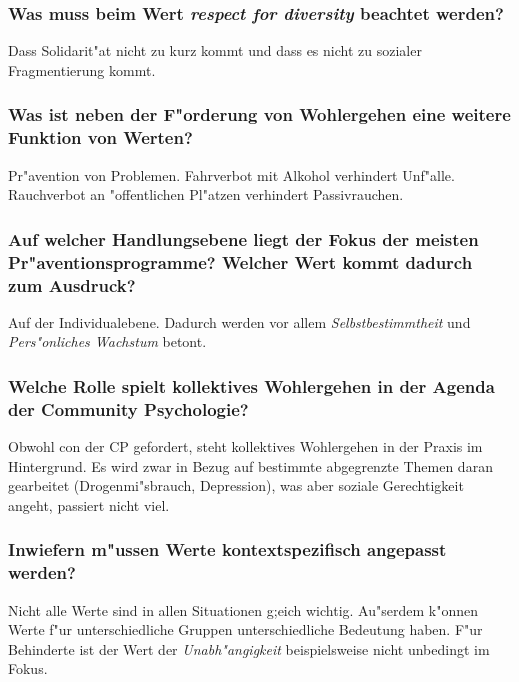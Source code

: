 \subsubsection{Was muss beim Wert \emph{respect for diversity} beachtet werden?}
Dass Solidarit"at nicht zu kurz kommt und dass es nicht zu sozialer Fragmentierung kommt.

\subsubsection{Was ist neben der F"orderung von Wohlergehen eine weitere Funktion von Werten?}
Pr"avention von Problemen. Fahrverbot mit Alkohol verhindert Unf"alle. Rauchverbot an "offentlichen Pl"atzen verhindert Passivrauchen.

\subsubsection{Auf welcher Handlungsebene liegt der Fokus der meisten Pr"aventionsprogramme? Welcher Wert kommt dadurch zum Ausdruck?}
Auf der Individualebene. Dadurch werden vor allem \emph{Selbstbestimmtheit} und \emph{Pers"onliches Wachstum} betont.

\subsubsection{Welche Rolle spielt kollektives Wohlergehen in der Agenda der Community Psychologie?}
Obwohl con der CP gefordert, steht kollektives Wohlergehen in der Praxis im Hintergrund. Es wird zwar in Bezug auf bestimmte abgegrenzte Themen daran gearbeitet (Drogenmi"sbrauch, Depression), was aber soziale Gerechtigkeit angeht, passiert nicht viel. 

\subsubsection{Inwiefern m"ussen Werte kontextspezifisch angepasst werden?}
Nicht alle Werte sind in allen Situationen g;eich wichtig. Au"serdem k"onnen Werte f"ur unterschiedliche Gruppen unterschiedliche Bedeutung haben. F"ur Behinderte ist der Wert der \emph{Unabh"angigkeit} beispielsweise nicht unbedingt im Fokus.

